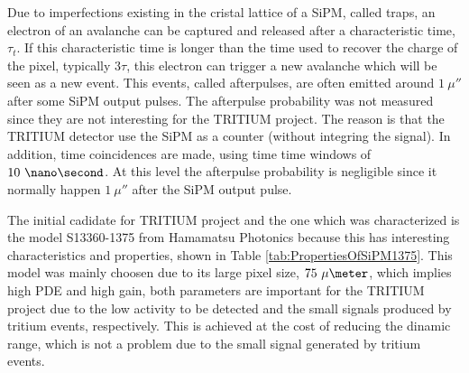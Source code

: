 Due to imperfections existing in the cristal lattice of a SiPM, called traps, an electron of an avalanche can be captured and released after a characteristic time, $\tau_t$. If this characteristic time is longer than the time used to recover the charge of the pixel, typically $3\tau$, this electron can trigger a new avalanche which will be seen as a new event. This events, called  afterpulses, are often emitted around $1~\mu\second$ after some SiPM output pulses. The afterpulse probability was not measured since they are not interesting for the TRITIUM project. The reason is that the TRITIUM detector use the SiPM as a counter (without integring the signal). In addition, time coincidences are made, using time time windows of $10~\nano\second$. At this level the afterpulse probability is negligible since it normally happen $1~\mu\second$ after the SiPM output pulse.

The initial cadidate for TRITIUM project and the one which was characterized is the model S13360-1375 from Hamamatsu Photonics \cite{DataSheetHammamatsu_1_SiPM_1375} because this has interesting characteristics and properties, shown in Table \ref{tab:PropertiesOfSiPM1375}. This model was mainly choosen due to its large pixel size, $75~\mu\meter$, which implies high PDE and high gain, both parameters are important for the TRITIUM project due to the low activity to be detected and the small signals produced by tritium events, respectively. This is achieved at the cost of reducing the dinamic range, which is not a problem due to the small signal generated by tritium events. 

